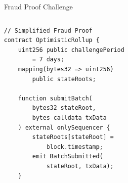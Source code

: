 \documentclass[8pt,aspectratio=169]{beamer}
\begin{document}
\begin{frame}[fragile]{Fraud Proof Challenge}
\begin{columns}[T]
\vspace{1mm}
\begin{lstlisting}[language=Solidity,caption={Simplified Fraud Proof}]
// Simplified Fraud Proof
contract OptimisticRollup {
    uint256 public challengePeriod
        = 7 days;
    mapping(bytes32 => uint256)
        public stateRoots;

    function submitBatch(
        bytes32 stateRoot,
        bytes calldata txData
    ) external onlySequencer {
        stateRoots[stateRoot] =
            block.timestamp;
        emit BatchSubmitted(
            stateRoot, txData);
    }


\end{lstlisting}
\end{columns}
\end{frame}
\end{document}
